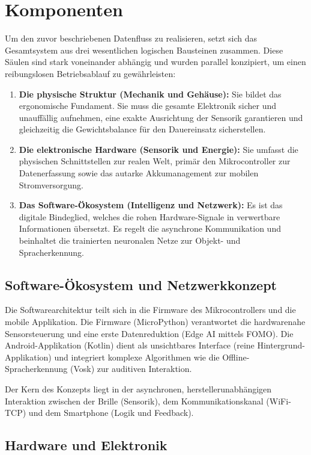 \section{Komponenten}
\label{sec:komponenten}
Um den zuvor beschriebenen Datenfluss zu realisieren, setzt sich das Gesamtsystem aus drei wesentlichen logischen Bausteinen zusammen. Diese Säulen sind stark voneinander abhängig und wurden parallel konzipiert, um einen reibungslosen Betriebsablauf zu gewährleisten:

\begin{enumerate}
    \item \textbf{Die physische Struktur (Mechanik und Gehäuse):} Sie bildet das ergonomische Fundament. Sie muss die gesamte Elektronik sicher und unauffällig aufnehmen, eine exakte Ausrichtung der Sensorik garantieren und gleichzeitig die Gewichtsbalance für den Dauereinsatz sicherstellen.
    \item \textbf{Die elektronische Hardware (Sensorik und Energie):} Sie umfasst die physischen Schnittstellen zur realen Welt, primär den Mikrocontroller zur Datenerfassung sowie das autarke Akkumanagement zur mobilen Stromversorgung.
    \item \textbf{Das Software-Ökosystem (Intelligenz und Netzwerk):} Es ist das digitale Bindeglied, welches die rohen Hardware-Signale in verwertbare Informationen übersetzt. Es regelt die asynchrone Kommunikation und beinhaltet die trainierten neuronalen Netze zur Objekt- und Spracherkennung.
\end{enumerate}

\subsection{Software-Ökosystem und Netzwerkkonzept}
\label{sec:konzept_software}
Die Softwarearchitektur teilt sich in die Firmware des Mikrocontrollers und die mobile Applikation. Die Firmware (MicroPython) verantwortet die hardwarenahe Sensorsteuerung und eine erste Datenreduktion (Edge AI mittels FOMO). Die Android-Applikation (Kotlin) dient als unsichtbares Interface (reine Hintergrund-Applikation) und integriert komplexe Algorithmen wie die Offline-Spracherkennung (Vosk) zur auditiven Interaktion.

Der Kern des Konzepts liegt in der asynchronen, herstellerunabhängigen Interaktion zwischen der Brille (Sensorik), dem Kommunikationskanal (WiFi-TCP) und dem Smartphone (Logik und Feedback).

\subsection{Hardware und Elektronik}
\label{sec:konzept_elektronik}

